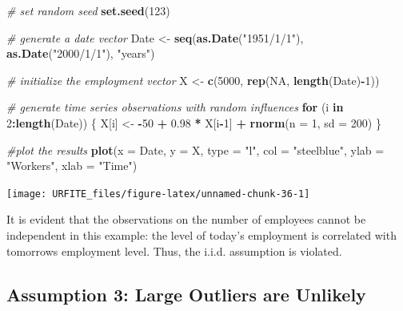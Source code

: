 \documentclass[]{book}
\newenvironment{Shaded}{\begin{snugshade}}{\end{snugshade}}
\newcommand{\KeywordTok}[1]{\textcolor[rgb]{0.13,0.29,0.53}{\textbf{#1}}}
\newcommand{\DataTypeTok}[1]{\textcolor[rgb]{0.13,0.29,0.53}{#1}}
\newcommand{\DecValTok}[1]{\textcolor[rgb]{0.00,0.00,0.81}{#1}}
\newcommand{\FloatTok}[1]{\textcolor[rgb]{0.00,0.00,0.81}{#1}}
\newcommand{\StringTok}[1]{\textcolor[rgb]{0.31,0.60,0.02}{#1}}
\newcommand{\CommentTok}[1]{\textcolor[rgb]{0.56,0.35,0.01}{\textit{#1}}}
\newcommand{\OtherTok}[1]{\textcolor[rgb]{0.56,0.35,0.01}{#1}}
\newcommand{\ControlFlowTok}[1]{\textcolor[rgb]{0.13,0.29,0.53}{\textbf{#1}}}
\newcommand{\OperatorTok}[1]{\textcolor[rgb]{0.81,0.36,0.00}{\textbf{#1}}}
\newcommand{\NormalTok}[1]{#1}
\theoremstyle{definition}
\theoremstyle{definition}
\theoremstyle{definition}
\theoremstyle{remark}
\begin{document}
\begin{Shaded}
\begin{Highlighting}[]
\CommentTok{# set random seed}
\KeywordTok{set.seed}\NormalTok{(}\DecValTok{123}\NormalTok{)}

\CommentTok{# generate a date vector}
\NormalTok{Date <-}\StringTok{ }\KeywordTok{seq}\NormalTok{(}\KeywordTok{as.Date}\NormalTok{(}\StringTok{"1951/1/1"}\NormalTok{), }\KeywordTok{as.Date}\NormalTok{(}\StringTok{"2000/1/1"}\NormalTok{), }\StringTok{"years"}\NormalTok{)}

\CommentTok{# initialize the employment vector}
\NormalTok{X <-}\StringTok{ }\KeywordTok{c}\NormalTok{(}\DecValTok{5000}\NormalTok{, }\KeywordTok{rep}\NormalTok{(}\OtherTok{NA}\NormalTok{, }\KeywordTok{length}\NormalTok{(Date)}\OperatorTok{-}\DecValTok{1}\NormalTok{))}

\CommentTok{# generate time series observations with random influences}
\ControlFlowTok{for}\NormalTok{ (i }\ControlFlowTok{in} \DecValTok{2}\OperatorTok{:}\KeywordTok{length}\NormalTok{(Date)) \{}
\NormalTok{    X[i] <-}\StringTok{ }\OperatorTok{-}\DecValTok{50} \OperatorTok{+}\StringTok{ }\FloatTok{0.98} \OperatorTok{*}\StringTok{ }\NormalTok{X[i}\OperatorTok{-}\DecValTok{1}\NormalTok{] }\OperatorTok{+}\StringTok{ }\KeywordTok{rnorm}\NormalTok{(}\DataTypeTok{n =} \DecValTok{1}\NormalTok{, }\DataTypeTok{sd =} \DecValTok{200}\NormalTok{)}
\NormalTok{\}}

\CommentTok{#plot the results}
\KeywordTok{plot}\NormalTok{(}\DataTypeTok{x =}\NormalTok{ Date, }
     \DataTypeTok{y =}\NormalTok{ X, }
     \DataTypeTok{type =} \StringTok{"l"}\NormalTok{, }
     \DataTypeTok{col =} \StringTok{"steelblue"}\NormalTok{, }
     \DataTypeTok{ylab =} \StringTok{"Workers"}\NormalTok{, }
     \DataTypeTok{xlab =} \StringTok{"Time"}\NormalTok{)}
\end{Highlighting}
\end{Shaded}

\begin{center}\texttt{[image: URFITE\_files/figure-latex/unnamed-chunk-36-1]} \end{center}

It is evident that the observations on the number of employees cannot be
independent in this example: the level of today's employment is
correlated with tomorrows employment level. Thus, the i.i.d. assumption
is violated.

\subsection*{Assumption 3: Large Outliers are
Unlikely}\label{assumption-3-large-outliers-are-unlikely}
\end{document}
